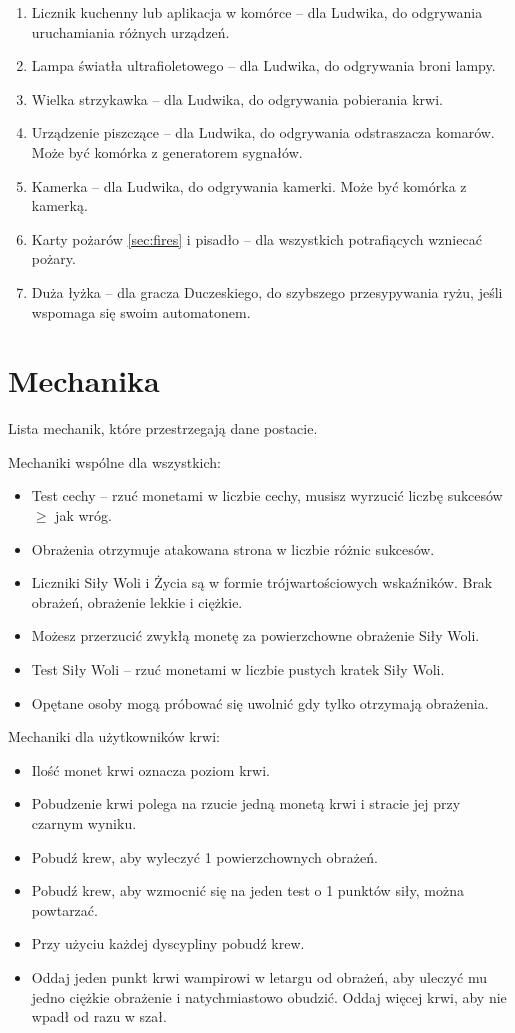\begin{enumerate}
		\item Licznik kuchenny lub aplikacja w komórce -- dla Ludwika, do odgrywania uruchamiania różnych urządzeń.
		\item Lampa światła ultrafioletowego -- dla Ludwika, do odgrywania broni lampy.
		\item Wielka strzykawka -- dla Ludwika, do odgrywania pobierania krwi.
		\item Urządzenie piszczące -- dla Ludwika, do odgrywania odstraszacza komarów. Może być komórka z generatorem sygnałów.
		\item Kamerka -- dla Ludwika, do odgrywania kamerki. Może być komórka z kamerką.
		\item Karty pożarów \ref{sec:fires} i pisadło -- dla wszystkich potrafiących wzniecać pożary.
		\item Duża łyżka --  dla gracza Duczeskiego, do szybszego przesypywania ryżu, jeśli wspomaga się swoim automatonem.
	\end{enumerate}
	
\section{Mechanika}
	Lista mechanik, które przestrzegają dane postacie.
	
	Mechaniki wspólne dla wszystkich:
	\begin{itemize}
		\item Test cechy -- rzuć monetami w liczbie cechy, musisz wyrzucić liczbę sukcesów $\geqslant$ jak wróg.
		\item Obrażenia otrzymuje atakowana strona w liczbie różnic sukcesów.
		\item Liczniki Siły Woli i Życia są w formie trójwartościowych wskaźników. Brak obrażeń, obrażenie lekkie i ciężkie.
		\item Możesz przerzucić zwykłą monetę za powierzchowne obrażenie Siły Woli.
		\item Test Siły Woli -- rzuć monetami w liczbie pustych kratek Siły Woli.
		\item Opętane osoby mogą próbować się uwolnić gdy tylko otrzymają obrażenia.
	\end{itemize}

	Mechaniki dla użytkowników krwi:
	\begin{itemize}
		\item Ilość monet krwi oznacza poziom krwi.
		\item Pobudzenie krwi polega na rzucie jedną monetą krwi i stracie jej przy czarnym wyniku.
		\item Pobudź krew, aby wyleczyć 1 powierzchownych obrażeń.
		\item Pobudź krew, aby wzmocnić się na jeden test o 1 punktów siły, można powtarzać.
		\item Przy użyciu każdej dyscypliny pobudź krew.
		\item Oddaj jeden punkt krwi wampirowi w letargu od obrażeń, aby uleczyć mu jedno ciężkie obrażenie i natychmiastowo obudzić. Oddaj więcej krwi, aby nie wpadł od razu w szał.
	\end{itemize}

